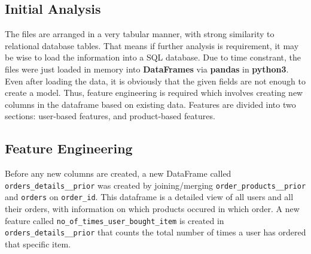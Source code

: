 \documentclass[12pt]{article}
\begin{document}
\subsection{Initial Analysis}
The files are arranged in a very tabular manner, with strong similarity to relational database tables. That means if further analysis is requirement, it may be wise to load the information into a SQL database. Due to time constrant, the files were just loaded in memory into \textbf{DataFrames} via \textbf{pandas} in \textbf{python3}.
\newline\newline
Even after loading the data, it is obviously that the given fields are not enough to create a model. Thus, feature engineering is required which involves creating new columns in the dataframe based on existing data. Features are divided into two sections: user-based features, and product-based features.

\subsection{Feature Engineering} \label{feature_engineering}
Before any new columns are created, a new DataFrame called \texttt{orders\_details\_\_prior} was created by joining/merging \texttt{order\_products\_\_prior} and \texttt{orders} on \texttt{order\_id}. This dataframe is a detailed view of all users and all their orders, with information on which products occured in which order.
\newline
\newline
A new feature called \texttt{no\_of\_times\_user\_bought\_item} is created in \texttt{orders\_details\_\_prior} that counts the total number of times a user has ordered that specific item.
\end{document}
